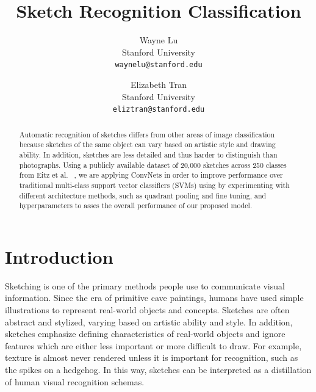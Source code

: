 \documentclass[10pt,twocolumn,letterpaper]{article}
\begin{document}
\title{Sketch Recognition Classification}

\author{Wayne Lu\\
Stanford University \\
{\tt\small waynelu@stanford.edu}
\and
Elizabeth Tran\\
Stanford University\\
{\tt\small eliztran@stanford.edu}
}

\maketitle

\begin{abstract}
 Automatic recognition of sketches differs from other areas of image classification because sketches of the same object can vary based on artistic style and drawing ability. In addition, sketches are less detailed and thus harder to distinguish than photographs. Using a publicly available dataset of 20,000 sketches across 250 classes from Eitz et al. ~\cite{eitz2012hdhso}, we are applying ConvNets in order to improve performance over traditional multi-class support vector classifiers (SVMs) using by experimenting with different architecture methods, such as quadrant pooling and fine tuning, and hyperparameters to asses the overall performance of our proposed model. 
\end{abstract}

\section{Introduction}
Sketching is one of the primary methods people use to communicate visual information. Since the era of primitive cave paintings, humans have used simple illustrations to represent real-world objects and concepts. Sketches are often abstract and stylized, varying based on artistic ability and style. In addition, sketches emphasize defining characteristics of real-world objects and ignore features which are either less important or more difficult to draw. For example, texture is almost never rendered unless it is important for recognition, such as the spikes on a hedgehog. In this way, sketches can be interpreted as a distillation of human visual recognition schemas.
\end{document}

